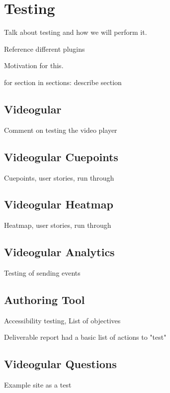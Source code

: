 \chapter{Testing} \label{Chapter: Testing}

Talk about testing and how we will perform it.

Reference different plugins

Motivation for this.

{for section in sections: describe section}

\section{Videogular}

Comment on testing the video player

\section{Videogular Cuepoints}

Cuepoints, user stories, run through

\section{Videogular Heatmap}

Heatmap, user stories, run through

\section{Videogular Analytics}

Testing of sending events

\section{Authoring Tool}

Accessibility testing, List of objectives

Deliverable report had a basic list of actions to "test"

\section{Videogular Questions}

Example site as a test

